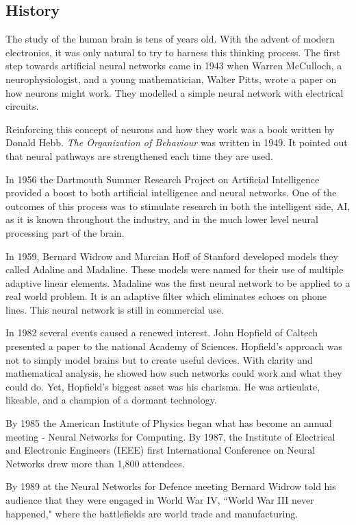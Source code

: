 \documentclass[12pt, a4paper, twoside]{report}
\begin{document}
\subsection{History}
The study of the human brain is tens of years old. With the advent of modern electronics, it was only natural to try to harness this thinking process. The first step towards artificial neural networks came in 1943 when Warren McCulloch, a neurophysiologist, and a young mathematician, Walter Pitts, wrote a paper on how neurons might work. They modelled a simple neural network with electrical circuits.
\par
Reinforcing this concept of neurons and how they work was a book written by Donald Hebb. {\itshape The Organization of Behaviour} was written in 1949. It pointed out that neural pathways are strengthened each time they are used.
\par
In 1956 the Dartmouth Summer Research Project on Artificial Intelligence provided a boost to both artificial intelligence and neural networks. One of the outcomes of this process was to stimulate research in both the intelligent side, AI, as it is known throughout the industry, and in the much lower level neural processing part of the brain.
\par
In 1959, Bernard Widrow and Marcian Hoff of Stanford developed models they called Adaline and Madaline. These models were named for their use of multiple adaptive linear elements. Madaline was the first neural network to be applied to a real world problem. It is an adaptive filter which eliminates echoes on phone lines. This neural network is still in commercial use.
\par
In 1982 several events caused a renewed interest. John Hopfield of Caltech presented a paper to the national Academy of Sciences. Hopfield's approach was not to simply model brains but to create useful devices. With clarity and mathematical analysis, he showed how such networks could work and what they could do. Yet, Hopfield's biggest asset was his charisma. He was articulate, likeable, and a champion of a dormant technology.
\par
By 1985 the American Institute of Physics began what has become an annual meeting - Neural Networks for Computing. By 1987, the Institute of Electrical and Electronic Engineers (IEEE) first International Conference on Neural Networks drew more than 1,800 attendees.
\par
By 1989 at the Neural Networks for Defence meeting Bernard Widrow told his audience that they were engaged in World War IV, ``World War III never happened," where the battlefields are world trade and manufacturing.
\end{document}
